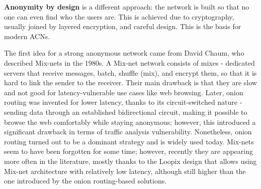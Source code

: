 \textbf{Anonymity by design} is a different approach: the network is built so that no one can even find who the users are. This is achieved due to cryptography, usually joined by layered encryption, and careful design. This is the basis for modern ACNs.

The first idea for a strong anonymous network came from David Chaum, who described Mix-nets in the 1980s. A Mix-net network consists of mixes - dedicated servers that receive messages, batch, shuffle (mix), and encrypt them, so that it is hard to link the sender to the receiver. Their main drawback is that they are slow and not good for latency-vulnerable use cases like web browsing. Later, onion routing was invented for lower latency, thanks to its circuit-switched nature - sending data through an established bidirectional circuit, making it possible to browse the web comfortably while staying anonymous; however, this introduced a significant drawback in terms of traffic analysis vulnerability. Nonetheless, onion routing turned out to be a dominant strategy and is widely used today. Mix-nets seem to have been forgotten for some time; however, recently they are appearing more often in the literature, mostly thanks to the Loopix design that allows using Mix-net architecture with relatively low latency, although still higher than the one introduced by the onion routing-based solutions.

